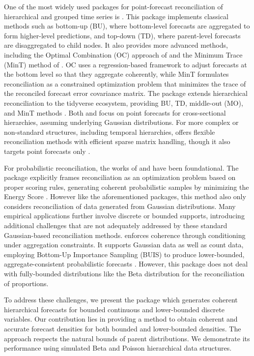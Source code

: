 One of the most widely used packages for point-forecast reconciliation of hierarchical and grouped time series is  \citep{htspackage}. This package implements classical methods such as bottom-up (BU), where bottom-level forecasts are aggregated to form higher-level predictions, and top-down (TD), where parent-level forecasts are disaggregated to child nodes. It also provides more advanced methods, including the Optimal Combination (OC) approach of \citet{Hyndman2011} and the Minimum Trace (MinT) method of \citet{Wickramasuriya2019}. OC uses a regression-based framework to adjust forecasts at the bottom level so that they aggregate coherently, while MinT formulates reconciliation as a constrained optimization problem that minimizes the trace of the reconciled forecast error covariance matrix. The  package extends hierarchical reconciliation to the tidyverse ecosystem, providing BU, TD, middle-out (MO), and MinT methods \citep{fabletools}. Both  and  focus on point forecasts for cross-sectional hierarchies, assuming underlying Gaussian distributions. For more complex or non-standard structures, including temporal hierarchies,  offers flexible reconciliation methods with efficient sparse matrix handling, though it also targets point forecasts only \citep{FoReco}.

For probabilistic reconciliation, the works of \citet{Taieb2017} and \citet{Panagiotelis2023} have been foundational. The  package explicitly frames reconciliation as an optimization problem based on proper scoring rules, generating coherent probabilistic samples by minimizing the Energy Score \citep{gneiting2007, Panagiotelis2023, ProbReco}. However like the aforementioned packages, this method also only considers reconciliation of data generated from Gaussian distributions. Many empirical applications further involve discrete or bounded supports, introducing additional challenges that are not adequately addressed by these standard Gaussian-based reconciliation methods.  enforces coherence through conditioning under aggregation constraints. It supports Gaussian data as well as count data, employing Bottom-Up Importance Sampling (BUIS) to produce lower-bounded, aggregate-consistent probabilistic forecasts \citep{Corani2023, bayesRecon}. However, this package does not deal with fully-bounded distributions like the Beta distribution for the reconciliation of proportions.

To address these challenges, we present the  package which generates coherent hierarchical forecasts for bounded continuous and lower-bounded discrete variables. Our contribution lies in providing a method to obtain coherent and accurate forecast densities for both bounded and lower-bounded densities. The approach respects the natural bounds of parent distributions. We demonstrate its performance using simulated Beta and Poisson hierarchical data structures.

